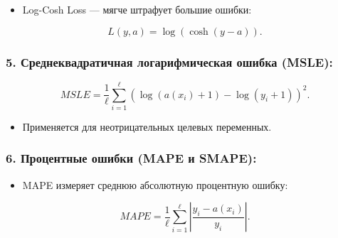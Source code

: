 \begin{itemize}
\tightlist
\item
  Log-Cosh Loss --- мягче штрафует большие ошибки:
\end{itemize}

\begin{equation}
L(y, a) = \log(\cosh(y - a)).
\end{equation}

\hypertarget{ux441ux440ux435ux434ux43dux435ux43aux432ux430ux434ux440ux430ux442ux438ux447ux43dux430ux44f-ux43bux43eux433ux430ux440ux438ux444ux43cux438ux447ux435ux441ux43aux430ux44f-ux43eux448ux438ux431ux43aux430-msle}{%
\subsubsection*{5. Среднеквадратичная логарифмическая ошибка
(MSLE):}\label{ux441ux440ux435ux434ux43dux435ux43aux432ux430ux434ux440ux430ux442ux438ux447ux43dux430ux44f-ux43bux43eux433ux430ux440ux438ux444ux43cux438ux447ux435ux441ux43aux430ux44f-ux43eux448ux438ux431ux43aux430-msle}}

\begin{equation}
MSLE = \frac{1}{\ell} \sum_{i=1}^{\ell} (\log(a(x_i) + 1) - \log(y_i + 1))^2.
\end{equation}

\begin{itemize}
\tightlist
\item
  Применяется для неотрицательных целевых переменных.
\end{itemize}

\hypertarget{ux43fux440ux43eux446ux435ux43dux442ux43dux44bux435-ux43eux448ux438ux431ux43aux438-mape-ux438-smape}{%
\subsubsection*{6. Процентные ошибки (MAPE и
SMAPE):}\label{ux43fux440ux43eux446ux435ux43dux442ux43dux44bux435-ux43eux448ux438ux431ux43aux438-mape-ux438-smape}}

\begin{itemize}
\tightlist
\item
  MAPE измеряет среднюю абсолютную процентную ошибку:
\end{itemize}

\begin{equation}
MAPE = \frac{1}{\ell} \sum_{i=1}^{\ell} \left|\frac{y_i - a(x_i)}{y_i}\right|.
\end{equation}


